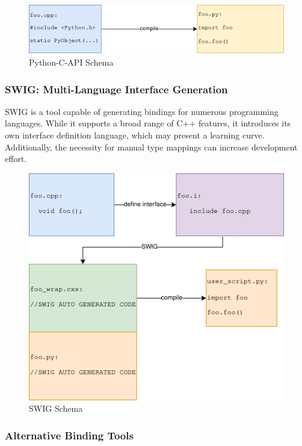\begin{figure}[htpb]
    \centering
    \includegraphics[width=\textwidth]{figures/python-C-API_schema.png}
    \caption{Python-C-API Schema}
    \label{fig:py-c-api-schema}
\end{figure}

\subsubsection{SWIG: Multi-Language Interface Generation}

SWIG is a tool capable of generating bindings for numerous programming languages. While it supports a broad range of C++ features, it introduces its own interface definition language, which may present a learning curve. Additionally, the necessity for manual type mappings can increase development effort. \cite{swig-docu}

\begin{figure}[htpb]
    \centering
    \includegraphics[scale=0.6]{figures/swig_schema.png}
    \caption{SWIG Schema}
    \label{fig:swig-schema}
\end{figure}


\subsubsection{Alternative Binding Tools}

